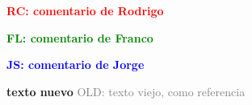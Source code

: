 \documentclass[11pt]{article}
\numberwithin{equation}{subsection}
\newcommand{\RC}[1]{\textcolor{Red}{\bf RC: #1}}
\newcommand{\FL}[1]{\textcolor{Green}{\bf FL: #1}}
\newcommand{\JS}[1]{\textcolor{Blue}{\bf JS: #1}}
\newcommand{\oldnew}[2]{\textcolor{BrickRed}{\bf #2} \textcolor{Gray}{OLD: #1}}
\begin{document}


	\newpage  %
	\newpage  %

        \RC{comentario de Rodrigo}

        \FL{comentario de Franco}

        \JS{comentario de Jorge}

        \oldnew{texto viejo, como referencia}{texto nuevo}

	\tableofcontents{}
    \listoffigures{}

	

	\newpage
	

	

	

	

	

	


\end{document}
